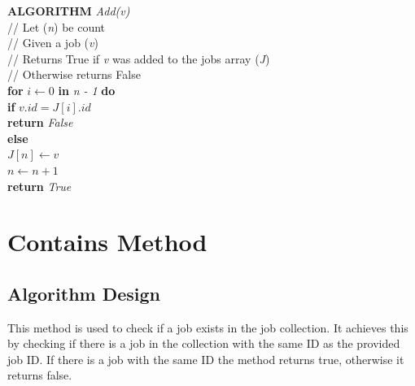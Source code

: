 \documentclass[12pt,a4paper]{article}
\begin{document}
			\textbf{ALGORITHM} \textit{Add(v)}\\
			\null\hspace{1cm}// Let (\textit{n}) be count\\
			\null\hspace{1cm}// Given a job (\textit{v})\\
			\null\hspace{1cm}// Returns True if \textit{v} was added to the jobs array (\textit{J})\\
			\null\hspace{1cm}// Otherwise returns False\\
			\null\hspace{1cm}\textbf{for} \textit{$i \gets 0$} \textbf{in} \textit{n - 1} \textbf{do}\\
			\null\hspace{2cm}\textbf{if} \textit{$v.id = J[i].id$}\\
			\null\hspace{3cm}\textbf{return} \textit{False}\\
			\null\hspace{1cm}\textbf{else}\\
			\null\hspace{2cm}\textit{$J[n] \gets v$}\\
			\null\hspace{2cm}\textit{$n \gets n + 1$}\\
			\null\hspace{2cm}\textbf{return} \textit{True}\\

	\section{Contains Method}
		\subsection{Algorithm Design}
			This method is used to check if a job exists in the job collection. It achieves this by 
			checking if there is a job in the collection with the same ID as the provided job ID. If there is 
			a job with the same ID the method returns true, otherwise it returns false.\\
\end{document}
